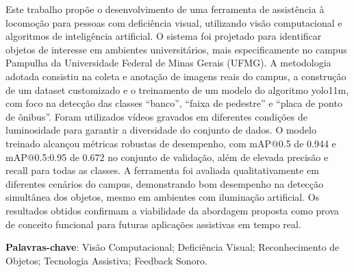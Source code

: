 \documentclass[
	12pt,				%
	openright,			%
	oneside,			%
	a4paper,			%
	english,			%
	french,				%
	spanish,			%
	brazil,				%
	]{abntex2}
\begin{document}
 \begin{resumo}
Este trabalho propõe o desenvolvimento de uma ferramenta de assistência à locomoção para pessoas com deficiência visual, utilizando visão computacional e algoritmos de inteligência artificial. O sistema foi projetado para identificar objetos de interesse em ambientes universitários, mais especificamente no campus Pampulha da Universidade Federal de Minas Gerais (UFMG). A metodologia adotada consistiu na coleta e anotação de imagens reais do campus, a construção de um dataset customizado e o treinamento de um modelo do algoritmo yolo11m, com foco na detecção das classes “banco”, “faixa de pedestre” e “placa de ponto de ônibus”. Foram utilizados vídeos gravados em diferentes condições de luminosidade para garantir a diversidade do conjunto de dados. O modelo treinado alcançou métricas robustas de desempenho, com mAP@0.5 de 0.944 e mAP@0.5:0.95 de 0.672 no conjunto de validação, além de elevada precisão e recall para todas as classes. A ferramenta foi avaliada qualitativamente em diferentes cenários do campus, demonstrando bom desempenho na detecção simultânea dos objetos, mesmo em ambientes com iluminação artificial. Os resultados obtidos confirmam a viabilidade da abordagem proposta como prova de conceito funcional para futuras aplicações assistivas em tempo real.

 \vspace{\onelineskip}
    
 \noindent
 \textbf{Palavras-chave}: Visão Computacional; Deficiência Visual; Reconhecimento de Objetos; Tecnologia Assistiva; Feedback Sonoro.
 \end{resumo}
\end{document}
